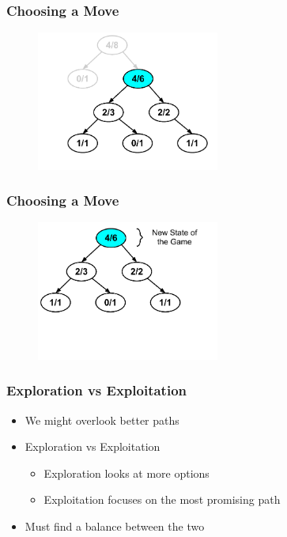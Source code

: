 \documentclass{beamer}
\begin{document}
\begin{frame}[fragile]
\frametitle{Choosing a Move}
\begin{figure}[h]
	\includegraphics[width=6cm]{Diagrams/MakeAMove/MakeAMoveTwo.pdf}
	\centering
\end{figure}
\end{frame}

\begin{frame}[fragile]
\frametitle{Choosing a Move}
\begin{figure}[h]
	\includegraphics[width=6cm]{Diagrams/MakeAMove/MakeAMoveThree.pdf}
	\centering
\end{figure}
\end{frame}

\begin{frame}
\frametitle{Exploration vs Exploitation}
\begin{itemize}
	\item We might overlook better paths
	\item Exploration vs Exploitation
	\begin{itemize}
		\item Exploration looks at more options
		\item Exploitation focuses on the most promising path
	\end{itemize}
	\item Must find a balance between the two
\end{itemize}
\end{frame}
\end{document}
